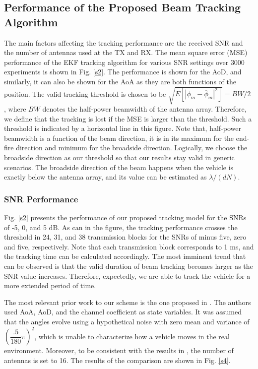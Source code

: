 \documentclass{ieeeaccess}
\begin{document}
\subsection{Performance of the Proposed Beam Tracking Algorithm}

The main factors affecting the tracking performance are the received SNR and the number of antennas used at the TX and RX. The mean square error (MSE) performance of the EKF tracking algorithm for various SNR settings over $3000$ experiments is shown in Fig. \ref{s2}. The performance is shown for the AoD, and similarly, it can also be shown for the AoA as they are both functions of the position. The valid tracking threshold is chosen to be $\sqrt{E[|\phi_m-\overline{\phi}_m|^2 ]} = BW/2$ \cite{rh_track}, where $BW$ denotes the half-power beamwidth of the antenna array. Therefore, we define that the tracking is lost if the MSE is larger than the threshold. Such a threshold is indicated by a horizontal line in this figure. Note that, half-power beamwidth is a function of the beam direction, it is in its maximum for the end-fire direction and minimum for the broadside direction\cite{antenna}. Logically, we choose the broadside direction as our threshold so that our results stay valid in generic scenarios. The broadside direction of the beam happens when the vehicle is exactly below the antenna array, and its value can be estimated as $\lambda /(dN)$.


\subsubsection{SNR Performance}


Fig. \ref{s2} presents the performance of our proposed tracking model for the SNRs of -5, 0, and 5 dB. As can in the figure, the tracking performance crosses the threshold in 24, 31, and 38 transmission blocks for the SNRs of minus five, zero and five, respectively. Note that each transmission block corresponds to 1 ms, and the tracking time can be calculated accordingly. The most imminent trend that can be observed is that the valid duration of beam tracking becomes larger as the SNR value increases. Therefore, expectedly, we are able to track the vehicle for a more extended period of time.





The most relevant prior work to our scheme is the one proposed in \cite{rh_track}. The authors used AoA, AoD, and the channel coefficient as state variables. It was assumed that the angles evolve using a hypothetical noise with zero mean and variance of $(\dfrac{.5}{180}\pi)^2$, which is unable to characterize how a vehicle moves in the real environment. Moreover, to be consistent with the results in \cite{rh_track}, the number of antennas is set to 16. The results of the comparison are shown in Fig. \ref{s4}.
\end{document}
